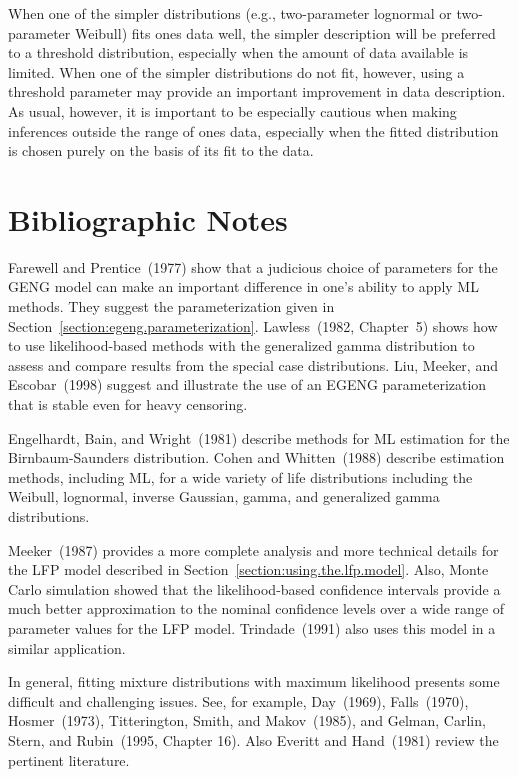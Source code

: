 When one of the simpler distributions (e.g., two-parameter
lognormal or two-parameter Weibull) fits ones data well, the simpler
description will be preferred to a threshold distribution,
especially when the amount of data available is limited. When one of
the simpler distributions do not fit, however, using a threshold
parameter may provide an important improvement in data
description. As usual, however, it is important to be especially
cautious when making inferences outside the range of ones data,
especially when the fitted distribution is chosen purely on the
basis of its fit to the data.


\section*{Bibliographic Notes}
Farewell and Prentice~(1977) show that a judicious choice of
parameters for the GENG model can make an important difference in
one's ability to apply ML methods.  They suggest the parameterization
given in Section~\ref{section:egeng.parameterization}.  Lawless~(1982,
Chapter~5) shows how to use likelihood-based methods with the
generalized gamma distribution to assess and compare results from the
special case distributions. Liu, Meeker, and Escobar~(1998) suggest
and illustrate the use of an EGENG parameterization that is stable
even for heavy censoring.

Engelhardt, Bain, and Wright~(1981) describe methods for ML estimation
for the Birnbaum-Saunders distribution. Cohen and Whitten~(1988)
describe estimation methods, including ML, for a wide variety of life
distributions including the Weibull, lognormal, inverse Gaussian,
gamma, and generalized gamma distributions.


Meeker~(1987) provides a more complete analysis and more technical
details for the LFP model described in
Section~\ref{section:using.the.lfp.model}.  Also, Monte Carlo
simulation showed that the likelihood-based confidence intervals
provide a much better approximation to the nominal confidence levels
over a wide range of parameter values for the LFP
model. Trindade~(1991) also uses this model in a similar
application.

In general, fitting mixture distributions with maximum likelihood
presents some difficult and challenging issues.  See, for example,
Day~(1969), Falls~(1970), Hosmer~(1973), Titterington, Smith, and
Makov~(1985), and Gelman, Carlin, Stern, and Rubin~(1995, Chapter 16).
Also Everitt and Hand~(1981) review the pertinent literature.


